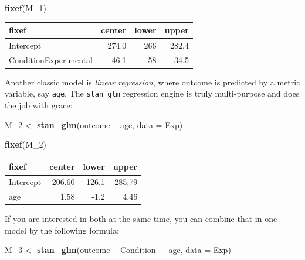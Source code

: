 \documentclass[]{svmono}
\newenvironment{Shaded}{\begin{snugshade}}{\end{snugshade}}
\newcommand{\KeywordTok}[1]{\textcolor[rgb]{0.13,0.29,0.53}{\textbf{#1}}}
\newcommand{\DataTypeTok}[1]{\textcolor[rgb]{0.13,0.29,0.53}{#1}}
\newcommand{\DecValTok}[1]{\textcolor[rgb]{0.00,0.00,0.81}{#1}}
\newcommand{\StringTok}[1]{\textcolor[rgb]{0.31,0.60,0.02}{#1}}
\newcommand{\OperatorTok}[1]{\textcolor[rgb]{0.81,0.36,0.00}{\textbf{#1}}}
\newcommand{\NormalTok}[1]{#1}
\theoremstyle{definition}
\theoremstyle{definition}
\theoremstyle{definition}
\theoremstyle{remark}
\begin{document}
\begin{Shaded}
\begin{Highlighting}[]
\KeywordTok{fixef}\NormalTok{(M_}\DecValTok{1}\NormalTok{)}
\end{Highlighting}
\end{Shaded}

\begin{longtable}[]{@{}lrrr@{}}
\toprule
fixef & center & lower & upper\tabularnewline
\midrule
\endhead
Intercept & 274.0 & 266 & 282.4\tabularnewline
ConditionExperimental & -46.1 & -58 & -34.5\tabularnewline
\bottomrule
\end{longtable}

Another classic model is \emph{linear regression}, where outcome is
predicted by a metric variable, say \texttt{age}. The \texttt{stan\_glm}
regression engine is truly multi-purpose and does the job with grace:

\begin{Shaded}
\begin{Highlighting}[]
\NormalTok{M_}\DecValTok{2}\NormalTok{ <-}\StringTok{ }
\StringTok{  }\KeywordTok{stan_glm}\NormalTok{(outcome }\OperatorTok{~}\StringTok{ }\NormalTok{age, }
     \DataTypeTok{data =}\NormalTok{ Exp)}
\end{Highlighting}
\end{Shaded}

\begin{Shaded}
\begin{Highlighting}[]
\KeywordTok{fixef}\NormalTok{(M_}\DecValTok{2}\NormalTok{)}
\end{Highlighting}
\end{Shaded}

\begin{longtable}[]{@{}lrrr@{}}
\toprule
fixef & center & lower & upper\tabularnewline
\midrule
\endhead
Intercept & 206.60 & 126.1 & 285.79\tabularnewline
age & 1.58 & -1.2 & 4.46\tabularnewline
\bottomrule
\end{longtable}

If you are interested in both at the same time, you can combine that in
one model by the following formula:

\begin{Shaded}
\begin{Highlighting}[]
\NormalTok{M_}\DecValTok{3}\NormalTok{ <-}\StringTok{ }
\StringTok{  }\KeywordTok{stan_glm}\NormalTok{(outcome }\OperatorTok{~}\StringTok{ }\NormalTok{Condition }\OperatorTok{+}\StringTok{ }\NormalTok{age, }
     \DataTypeTok{data =}\NormalTok{ Exp)}
\end{Highlighting}
\end{Shaded}
\end{document}
